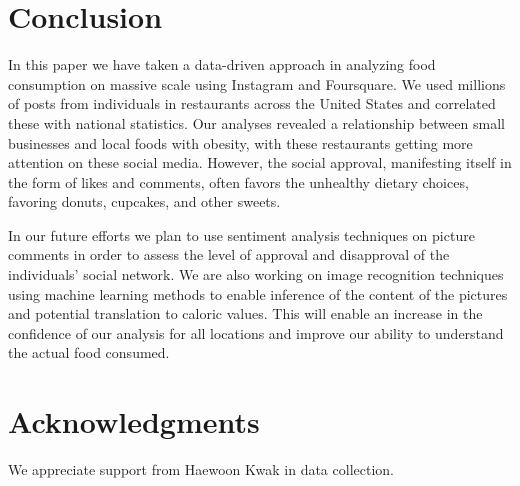 \documentclass{sig-alternate-2013}
\begin{document}
\section{Conclusion}
\label{sec:conclusion}

In this paper we have taken a data-driven approach in analyzing food consumption on massive scale using Instagram and Foursquare. We used millions of posts from individuals in restaurants across the United States and correlated these with national statistics. Our analyses revealed a relationship between small businesses and local foods with obesity, with these restaurants getting more attention on these social media. However, the social approval, manifesting itself in the form of likes and comments, often favors the unhealthy dietary choices, favoring donuts, cupcakes, and other sweets.

In our future efforts we plan to use sentiment analysis techniques on picture comments in order to assess the level of approval and disapproval of the individuals' social network. We are also working on image recognition techniques using machine learning methods to enable inference of the content of the pictures and potential translation to caloric values. This will enable an increase in the confidence of our analysis for all locations and improve our ability to understand the actual food consumed.

 	
\section*{Acknowledgments}
We appreciate support from Haewoon Kwak in data collection.
\end{document}
